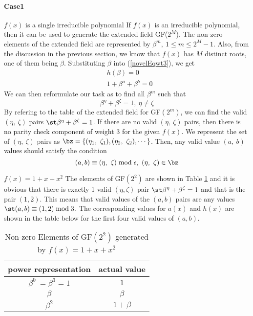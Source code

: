 \paragraph{ Case1} $f(x)$ is a single irreducible polynomial \newline
If $f(x)$ is an irreducible polynomial, then it can be used to generate the extended field GF($2^M$). The non-zero elements of the extended field are represented by $\beta^m,~1 \leq m \leq 2^M-1$. Also, from the discussion in the previous section, we know that $f(x)$ has $M$ distinct roots, one of them being $\beta$. Substituting $\beta$ into (\ref{novelEqwt3}), we get 
\begin{equation}
\begin{split}
&h(\beta)=0\\
&1+\beta^a+\beta^b=0
\end{split}
\label{novelEqwt3-1}
\end{equation}
We can then reformulate our task as to find all $\beta^m$ such that 
\begin{equation}
\beta^{\eta}+\beta^{\zeta}=1,~\eta \neq \zeta
\end{equation}
By refering to the table of the extended field for GF$(2^m)$, we can find the valid $(\eta,~\zeta)$ pairs $\st \beta^{\eta}+\beta^{\zeta}=1$. If there are no valid $(\eta,~\zeta)$ pairs, then there is no parity check component of weight $3$ for the given $f(x)$.
 We represent the set of $(\eta,~\zeta)$ pairs as 
$\bz=\{ (\eta_1,~\zeta_1) ,( \eta_2,~\zeta_2),\cdots\}$. Then, any valid value $(a,~b)$ values should satisfy the condition
\begin{equation}
(a,b) \equiv (\eta,~\zeta) \bmod \epsilon,~(\eta,~\zeta)\in \bz
\end{equation}
\begin{example}
$f(x)=1+x+x^2$ \newline
The elements of GF$(2^2)$ are shown in Table \ref{novelTab7} and it is obvious that there is exactly 1 valid $(\eta,\zeta)$ pair $\st \beta^{\eta}+\beta^{\zeta} = 1$ and that is the pair $(1,2)$.
This means that valid values of the $(a,b)$ pairs are any values $\st (a,b) \equiv (1,2) \bmod 3$.  The corresponding values for $a(x)$ and $h(x)$ are shown in the table below for the first four valid values of $(a,b)$.
\end{example}

 \begin{table}[htbp]
 \caption{Non-zero Elements of GF$(2^2)$ generated by $f(x)=1+x+x^2$}
\centering
 \begin{tabular}{c c} 
 \hline
 power representation & actual value \\ [0.5ex] 
 \hline\hline
$\beta^0~=\beta^3=1$ & $1$\\
\hline
$\beta$ & $\beta$\\
\hline
$\beta^2$ &  $1+\beta$\\
\hline
 \end{tabular}
 \label{novelTab7}
\end{table}


